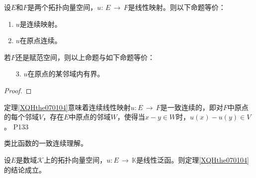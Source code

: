 \begin{theorem}\label{XQHthe070104}
	设$E$和$F$是两个拓扑向量空间，$u:\, E\, \rightarrow \, F $是线性映射。则以下命题等价：
	\begin{enumerate}
		\item $u$是连续映射。
		\item $u$在原点连续。
	\end{enumerate}
	若$F$还是赋范空间，则以上命题与如下命题等价：
	\begin{enumerate}
		\item[3.] $u$在原点的某邻域内有界。 
	\end{enumerate}
\end{theorem}

\begin{proof}
	
\end{proof}

\original
{定理\ref{XQHthe070104}意味着连续线性映射$u:E\, \rightarrow \, F $是一致连续的，即对$F$中原点的每个邻域$V$，存在$E$中原点的邻域$W$，使得当$x-y\in W $时，$u(x)-u(y) \in V $。
}
{P133}
\begin{remark}
	类比函数的一致连续理解。
\end{remark}

\begin{corollary}
	设$E$是数域$\mathcal{K}$上的拓扑向量空间，$u:E\, \rightarrow \, \mathbb{K} $是线性泛函。则定理\ref{XQHthe070104}的结论成立。
\end{corollary}










